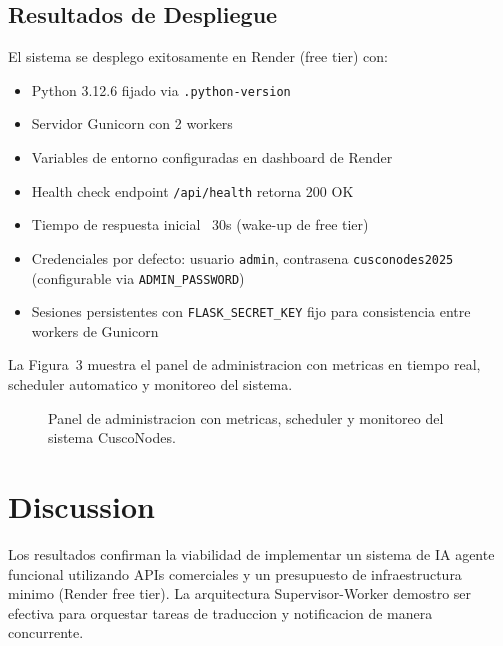 \documentclass[10pt,twocolumn,a4paper]{article}
\begin{document}
\subsection{Resultados de Despliegue}

El sistema se desplego exitosamente en Render (free tier) con:
\begin{itemize}
  \item Python 3.12.6 fijado via \texttt{.python-version}
  \item Servidor Gunicorn con 2 workers
  \item Variables de entorno configuradas en dashboard de Render
  \item Health check endpoint \texttt{/api/health} retorna 200 OK
   \item Tiempo de respuesta inicial ~30s (wake-up de free tier)
   \item Credenciales por defecto: usuario \texttt{admin}, contrasena \texttt{cusconodes2025} (configurable via \texttt{ADMIN\_PASSWORD})
   \item Sesiones persistentes con \texttt{FLASK\_SECRET\_KEY} fijo para consistencia entre workers de Gunicorn
\end{itemize}

La Figura~3 muestra el panel de administracion con metricas
en tiempo real, scheduler automatico y monitoreo del sistema.

\begin{figure}[t]
\centering
{}
\caption{Panel de administracion con metricas, scheduler y
monitoreo del sistema CuscoNodes.}
\label{fig:admin}
\end{figure}

\section{Discussion}

\lettrine[lines=2]{L}{}os resultados confirman la viabilidad de
implementar un sistema de IA agente funcional utilizando APIs
comerciales y un presupuesto de infraestructura minimo (Render free
tier). La arquitectura Supervisor-Worker demostro ser efectiva para
orquestar tareas de traduccion y notificacion de manera
concurrente.
\end{document}
